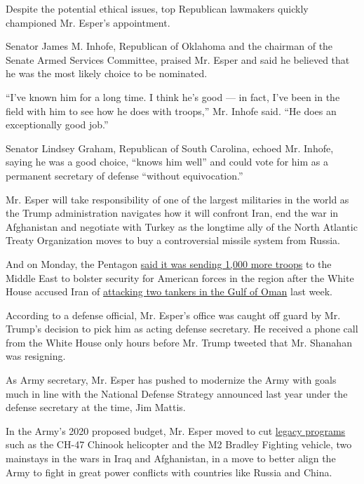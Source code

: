 Despite the potential ethical issues, top Republican lawmakers quickly
championed Mr. Esper's appointment.

Senator James M. Inhofe, Republican of Oklahoma and the chairman of the
Senate Armed Services Committee, praised Mr. Esper and said he believed
that he was the most likely choice to be nominated.

``I've known him for a long time. I think he's good --- in fact, I've
been in the field with him to see how he does with troops,'' Mr. Inhofe
said. ``He does an exceptionally good job.''

Senator Lindsey Graham, Republican of South Carolina, echoed Mr. Inhofe,
saying he was a good choice, ``knows him well'' and could vote for him
as a permanent secretary of defense ``without equivocation.''

Mr. Esper will take responsibility of one of the largest militaries in
the world as the Trump administration navigates how it will confront
Iran, end the war in Afghanistan and negotiate with Turkey as the
longtime ally of the North Atlantic Treaty Organization moves to buy a
controversial missile system from Russia.

And on Monday, the Pentagon
\href{https://www.nytimes.com/2019/06/17/world/middleeast/iran-nuclear-deal-compliance.html}{said
it was sending 1,000 more troops} to the Middle East to bolster security
for American forces in the region after the White House accused Iran of
\href{https://www.nytimes.com/2019/06/14/world/middleeast/gulf-oman-tanker-attack.html}{attacking
two tankers in the Gulf of Oman} last week.

According to a defense official, Mr. Esper's office was caught off guard
by Mr. Trump's decision to pick him as acting defense secretary. He
received a phone call from the White House only hours before Mr. Trump
tweeted that Mr. Shanahan was resigning.

As Army secretary, Mr. Esper has pushed to modernize the Army with goals
much in line with the National Defense Strategy announced last year
under the defense secretary at the time, Jim Mattis.

In the Army's 2020 proposed budget, Mr. Esper moved to cut
\href{https://www.wsj.com/articles/army-plans-to-cut-back-on-legacy-gear-in-a-push-for-new-tech-11552410807}{legacy
programs} such as the CH-47 Chinook helicopter and the M2 Bradley
Fighting vehicle, two mainstays in the wars in Iraq and Afghanistan, in
a move to better align the Army to fight in great power conflicts with
countries like Russia and China.

